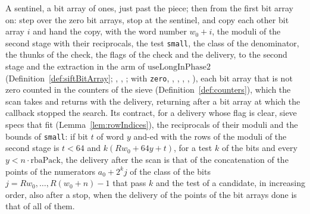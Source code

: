 \begin{definition}\label{def:scanPiece}
  \leanok
  A sentinel, a bit array of ones, just past the piece; then from the first bit array on: step over
  the zero bit arrays, stop at the sentinel, and copy each other bit array $i$ and hand the copy,
  with the word number $w_0 + i$, the moduli of the second stage with their reciprocals, the test
  \verb|small|, the class of the denominator, the thunks of the check, the flags of the check and
  the delivery, to the second stage and the extraction in the arm of $\mathrm{useLongInPhase2}$
  (Definition~\ref{def:siftBitArray}; , ,
  ; with \verb|zero|, ,
  , ,
  , ), each bit array that is not
  zero counted in the counters of the sieve (Definition~\ref{def:counters}), which the scan takes
  and returns with the delivery, returning after a bit array at which the callback stopped the
  search. Its contract, for a delivery whose flag is clear, sieve specs that fit
  (Lemma~\ref{lem:rowIndices}), the reciprocals of their moduli and the bounds of \verb|small|: if
  bit $t$ of word $y$ and-ed with the rows of the moduli of the second stage is $t < 64$ and
  $k(R w_0 + 64 y + t)$, for a test $k$ of the bits and every $y < n \cdot \mathrm{rbaPack}$, the
  delivery after the scan is that of the concatenation of the points of the numerators $a_0 + 2^k j$
  of the class of the bits $j = R w_0, \dots, R(w_0 + n) - 1$ that pass $k$ and the test of a
  candidate, in increasing order, also after a stop, when the delivery of the points of the bit
  arrays done is that of all of them.
\end{definition}

